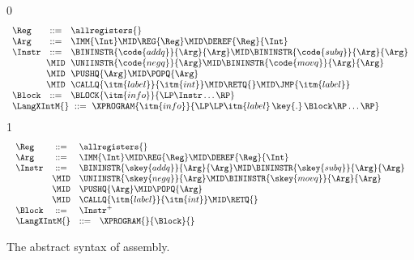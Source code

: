 \documentclass[7x10]{TimesAPriori_MIT}%
\def\racketEd{0}
\def\pythonEd{1}
\def\edition{1}
\newcommand{\pythonColor}[0]{}
\numberwithin{theorem}{chapter}
\numberwithin{definition}{chapter}
\numberwithin{equation}{chapter}
\begin{document}
\newcommand{\ASTXIntRacket}{
\begin{array}{lcl}
\Reg &::=& \allregisters{} \\
\Arg &::=&  \IMM{\Int} \MID \REG{\Reg}
   \MID \DEREF{\Reg}{\Int} \\
\Instr &::=& \BININSTR{\code{addq}}{\Arg}{\Arg} 
       \MID \BININSTR{\code{subq}}{\Arg}{\Arg}\\
       &\MID& \UNIINSTR{\code{negq}}{\Arg}
       \MID \BININSTR{\code{movq}}{\Arg}{\Arg}\\
       &\MID& \PUSHQ{\Arg}
       \MID \POPQ{\Arg} \\
      &\MID& \CALLQ{\itm{label}}{\itm{int}}
       \MID \RETQ{}
       \MID \JMP{\itm{label}}  \\
\Block &::= & \BLOCK{\itm{info}}{\LP\Instr\ldots\RP} 
\end{array}
}
\newcommand{\ASTXIntPython}{
\begin{array}{lcl}
\Reg &::=& \allregisters{} \\
\Arg &::=&  \IMM{\Int} \MID \REG{\Reg}
   \MID \DEREF{\Reg}{\Int} \\
\Instr &::=& \BININSTR{\skey{addq}}{\Arg}{\Arg} 
       \MID \BININSTR{\skey{subq}}{\Arg}{\Arg}\\
       &\MID& \UNIINSTR{\skey{negq}}{\Arg}
       \MID \BININSTR{\skey{movq}}{\Arg}{\Arg}\\
       &\MID& \PUSHQ{\Arg}
       \MID \POPQ{\Arg} \\
      &\MID& \CALLQ{\itm{label}}{\itm{int}}
       \MID \RETQ{}  \\
\Block &::= & \Instr^{+} 
\end{array}
}


\begin{figure}[tp]
\begin{tcolorbox}[colback=white]
\small
{\if\edition\racketEd
\[\arraycolsep=3pt
\begin{array}{l}
  \ASTXIntRacket \\
\begin{array}{lcl}
\LangXIntM{} &::= & \XPROGRAM{\itm{info}}{\LP\LP\itm{label} \,\key{.}\, \Block \RP\ldots\RP}
\end{array}
\end{array}
\]
\fi}
{\if\edition\pythonEd\pythonColor
\[
\begin{array}{l}
 \ASTXIntPython \\
\begin{array}{lcl}
\LangXIntM{} &::= & \XPROGRAM{}{\Block}{}
\end{array}
\end{array}
\]
\fi}
\end{tcolorbox}
\caption{The abstract syntax of \LangXInt{} assembly.}
\label{fig:x86-int-ast}
\end{figure}
\end{document}
